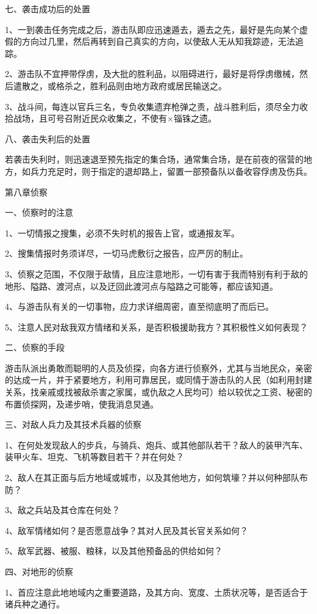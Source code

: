 七、袭击成功后的处置

1、一到袭击任务完成之后，游击队即应迅速遁去，遁去之先，最好是先向某个虚假的方向过几里，然后再转到自己真实的方向，以使敌人无从知我踪迹，无法追踪。

2、游击队不宜押带俘虏，及大批的胜利品，以阻碍进行，最好是将俘虏缴械，然后遣散之，或格杀之，胜利品则由地方政府或居民输送之。

3、战斗间，每连以官兵三名，专负收集遗弃枪弹之责，战斗胜利后，须尽全力收拾战场，且可号召附近民众收集之，不使有×锱铢之遗。

八、袭击失利后的处置

若袭击失利时，则迅速退至预先指定的集合场，通常集合场，是在前夜的宿营的地方，如兵力充足时，则于指定的退却路上，留置一部预备队以备收容俘虏及伤兵。

第八章侦察

一、侦察时的注意

1、一切情报之搜集，必须不失时机的报告上官，或通报友军。

2、搜集情报时务须详尽，一切马虎敷衍之报告，应严厉的制止。

3、侦察之范围，不仅限于敌情，且应注意地形，一切有害于我而特别有利于敌的地形、隘路、渡河点，以及迂回此渡河点与隘路之可能等，都应该知道。

4、与游击队有关的一切事物，应力求详细周密，直至彻底明了而后已。

5、注意人民对敌我双方情绪和关系，是否积极援助我方？其积极性义如何表现？

二、侦察的手段

游击队派出勇敢而聪明的人员及侦探，向各方进行侦察外，尤其与当地民众，亲密的达成一片，并于紧要地方，利用可靠居民，或同情于游击队的人民（如利用封建关系，找亲戚或找被敌杀害之家属，或仇敌之人民均可）给以较优之工资、秘密的布置侦探网，及递步哨，使我消息炅通。

三、对敌人兵力及其技术兵器的侦察

1、在何处发现敌人的步兵，与骑兵、炮兵、或其他部队若干？敌人的装甲汽车、装甲火车、坦克、飞机等数目若干？并在何处？

2、敌人在其正面与后方地域或城市，以及其他地方，如何筑壕？并以何种部队布防？

3、敌之兵站及其仓库在何处？

4、敌军情绪如何？是否愿意战争？其对人民及其长官关系如何？

5、敌军武器、被服、粮秣，以及其他预备品的供给如何？

四、对地形的侦察

1、首应注意此地地域内之重要道路，及其方向、宽度、土质状况等，是否适合于诸兵种之通行。


